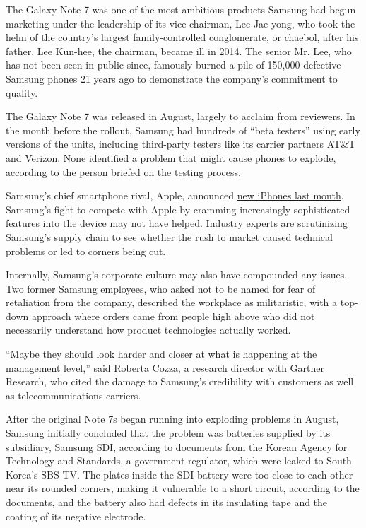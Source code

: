 The Galaxy Note 7 was one of the most ambitious products Samsung had
begun marketing under the leadership of its vice chairman, Lee Jae-yong,
who took the helm of the country's largest family-controlled
conglomerate, or chaebol, after his father, Lee Kun-hee, the chairman,
became ill in 2014. The senior Mr. Lee, who has not been seen in public
since, famously burned a pile of 150,000 defective Samsung phones 21
years ago to demonstrate the company's commitment to quality.

The Galaxy Note 7 was released in August, largely to acclaim from
reviewers. In the month before the rollout, Samsung had hundreds of
``beta testers'' using early versions of the units, including
third-party testers like its carrier partners AT\&T and Verizon. None
identified a problem that might cause phones to explode, according to
the person briefed on the testing process.

Samsung's chief smartphone rival, Apple, announced
\href{http://www.nytimes3xbfgragh.onion/2016/09/08/technology/iphone-7-apple-headphone-jack.html}{new
iPhones last month}. Samsung's fight to compete with Apple by cramming
increasingly sophisticated features into the device may not have helped.
Industry experts are scrutinizing Samsung's supply chain to see whether
the rush to market caused technical problems or led to corners being
cut.

Internally, Samsung's corporate culture may also have compounded any
issues. Two former Samsung employees, who asked not to be named for fear
of retaliation from the company, described the workplace as
militaristic, with a top-down approach where orders came from people
high above who did not necessarily understand how product technologies
actually worked.

``Maybe they should look harder and closer at what is happening at the
management level,'' said Roberta Cozza, a research director with Gartner
Research, who cited the damage to Samsung's credibility with customers
as well as telecommunications carriers.

After the original Note 7s began running into exploding problems in
August, Samsung initially concluded that the problem was batteries
supplied by its subsidiary, Samsung SDI, according to documents from the
Korean Agency for Technology and Standards, a government regulator,
which were leaked to South Korea's SBS TV. The plates inside the SDI
battery were too close to each other near its rounded corners, making it
vulnerable to a short circuit, according to the documents, and the
battery also had defects in its insulating tape and the coating of its
negative electrode.

